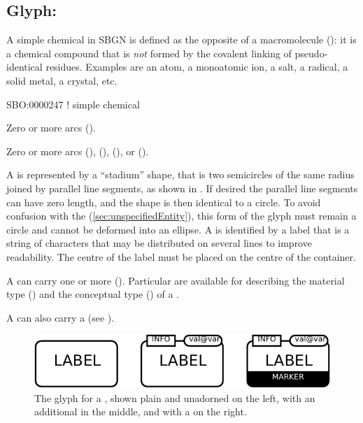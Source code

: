 \subsection{Glyph: }
\label{sec:simpleChemical}

A simple chemical in SBGN is defined as the opposite of a macromolecule (): it is a chemical compound that is \emph{not} formed by the covalent linking of pseudo-identical residues. 
Examples  are an atom, a monoatomic ion, a salt, a radical, a solid metal, a crystal, etc.

\begin{glyphDescription}

\glyphSboTerm
SBO:0000247 ! simple chemical


\glyphIncoming
Zero or more  arcs ().



\glyphOutgoing
Zero or more  arcs (),  (),  (), or  ().


\glyphContainer
A  is represented by a ``stadium'' shape, that is two semicircles of the same radius joined by parallel line segments, as shown in .
If desired the parallel line segments can have zero length, and the shape is then identical to a circle.
To avoid confusion with the  (\ref{sec:unspecifiedEntity}), this form of the glyph must remain a circle and cannot be deformed into an ellipse.
\glyphLabel
A  is identified by a label  that is a string of characters that may be distributed on several lines to improve readability.
The centre of the label must be placed on the centre of the container.


\glyphAux
A  can carry one or more  ().
Particular  are available for describing the material type () and the conceptual type () of a .

A  can also carry a  (see ).

\end{glyphDescription}

\begin{figure}[H]
  \centering
  \includegraphics{images/build/simple_chemical_combined.pdf}
  \caption{The \PD glyph for a , shown plain and unadorned on the left, with an additional  in the middle, and with a  on the right.}
  \label{fig:simpleChemical}
\end{figure}

